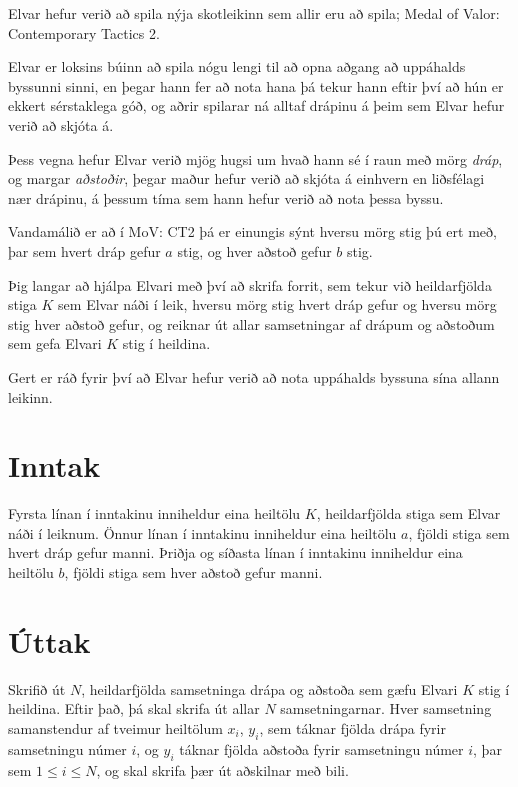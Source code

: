 
Elvar hefur verið að spila nýja skotleikinn sem allir eru að spila;
Medal of Valor: Contemporary Tactics 2.

Elvar er loksins búinn að spila nógu lengi til að opna aðgang að uppáhalds byssunni sinni,
en þegar hann fer að nota hana þá tekur hann eftir því að hún er ekkert sérstaklega góð,
og aðrir spilarar ná alltaf drápinu á þeim sem Elvar hefur verið að skjóta á.

Þess vegna hefur Elvar verið mjög hugsi um hvað hann sé í raun með mörg \emph{dráp},
og margar \emph{aðstoðir}, þegar maður hefur verið að skjóta á einhvern en liðsfélagi nær drápinu,
á þessum tíma sem hann hefur verið að nota þessa byssu.

Vandamálið er að í MoV: CT2 þá er einungis sýnt hversu mörg stig þú ert með,
þar sem hvert dráp gefur $a$ stig, og hver aðstoð gefur $b$ stig.

Þig langar að hjálpa Elvari með því að skrifa forrit,
sem tekur við heildarfjölda stiga $K$ sem Elvar náði í leik,
hversu mörg stig hvert dráp gefur og hversu mörg stig
hver aðstoð gefur, og reiknar út allar samsetningar af drápum
og aðstoðum sem gefa Elvari $K$ stig í heildina.

Gert er ráð fyrir því að Elvar hefur verið að nota uppáhalds byssuna sína allann leikinn.

\section*{Inntak}
Fyrsta línan í inntakinu inniheldur eina heiltölu $K$, heildarfjölda stiga sem Elvar náði í leiknum.
Önnur línan í inntakinu inniheldur eina heiltölu $a$, fjöldi stiga sem hvert dráp gefur manni.
Þriðja og síðasta línan í inntakinu inniheldur eina heiltölu $b$, fjöldi stiga sem hver aðstoð gefur manni.

\section*{Úttak}
Skrifið út $N$, heildarfjölda samsetninga drápa og aðstoða sem gæfu Elvari $K$ stig í heildina.
Eftir það, þá skal skrifa út allar $N$ samsetningarnar.
Hver samsetning samanstendur af tveimur heiltölum $x_i$, $y_i$, sem táknar fjölda drápa fyrir samsetningu númer $i$,
og $y_i$ táknar fjölda aðstoða fyrir samsetningu númer $i$, þar sem $1 \leq i \leq N$, og skal skrifa þær út aðskilnar með bili.

